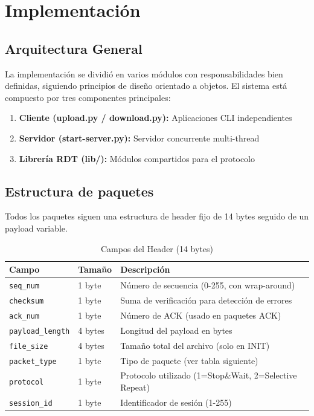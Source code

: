 \section{Implementación}
\subsection{Arquitectura General}
La implementación se dividió en varios módulos con responsabilidades bien definidas, siguiendo principios de diseño orientado a objetos.
El sistema está compuesto por tres componentes principales:

\begin{enumerate}
    \item \textbf{Cliente (upload.py / download.py):} Aplicaciones CLI independientes
    \item \textbf{Servidor (start-server.py):} Servidor concurrente multi-thread
    \item \textbf{Librería RDT (lib/):} Módulos compartidos para el protocolo
\end{enumerate}

\subsection{Estructura de paquetes}
Todos los paquetes siguen una estructura de header fijo de 14 bytes seguido de un payload variable.

\begin{table}[H]
\centering
\begin{tabular}{@{}lll@{}}
\toprule
\textbf{Campo}        & \textbf{Tamaño} & \textbf{Descripción} \\ \midrule
\texttt{seq\_num}     & 1 byte  & Número de secuencia (0-255, con wrap-around) \\
\texttt{checksum}     & 1 byte  & Suma de verificación para detección de errores \\
\texttt{ack\_num}     & 1 byte  & Número de ACK (usado en paquetes ACK) \\
\texttt{payload\_length} & 4 bytes & Longitud del payload en bytes \\
\texttt{file\_size}   & 4 bytes & Tamaño total del archivo (solo en INIT) \\
\texttt{packet\_type} & 1 byte  & Tipo de paquete (ver tabla siguiente) \\
\texttt{protocol}     & 1 byte  & Protocolo utilizado (1=Stop\&Wait, 2=Selective Repeat) \\
\texttt{session\_id}  & 1 byte  & Identificador de sesión (1-255) \\ \bottomrule
\end{tabular}
\caption{Campos del Header (14 bytes)}
\end{table}

